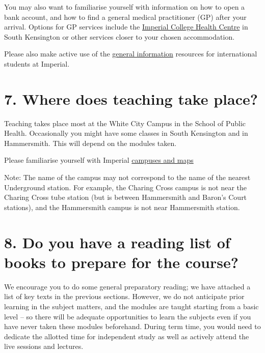 \documentclass[
]{book}
\begin{document}
You may also want to familiarise yourself with information on how to open a bank account, and how to find a general medical practitioner (GP) after your arrival. Options for GP services include the \href{https://www.imperialcollegehealthcentre.co.uk/}{Imperial College Health Centre} in South Kensington or other services closer to your chosen accommodation.

Please also make active use of the \href{https://www.imperial.ac.uk/study/international-students/}{general information} resources for international students at Imperial.

\section*{7. Where does teaching take place?}\label{where-does-teaching-take-place}

Teaching takes place most at the White City Campus in the School of Public Health. Occasionally you might have some classes in South Kensington and in Hammersmith. This will depend on the modules taken.

Please familiarise yourself with Imperial \href{https://www.imperial.ac.uk/visit/campuses/}{campuses and maps}

Note: The name of the campus may not correspond to the name of the nearest Underground station. For example, the Charing Cross campus is not near the Charing Cross tube station (but is between Hammersmith and Baron's Court stations), and the Hammersmith campus is not near Hammersmith station.

\section*{8. Do you have a reading list of books to prepare for the course?}\label{do-you-have-a-reading-list-of-books-to-prepare-for-the-course}

We encourage you to do some general preparatory reading; we have attached a list of key texts in the previous sections. However, we do not anticipate prior learning in the subject matters, and the modules are taught starting from a basic level -- so there will be adequate opportunities to learn the subjects even if you have never taken these modules beforehand. During term time, you would need to dedicate the allotted time for independent study as well as actively attend the live sessions and lectures.
\end{document}
